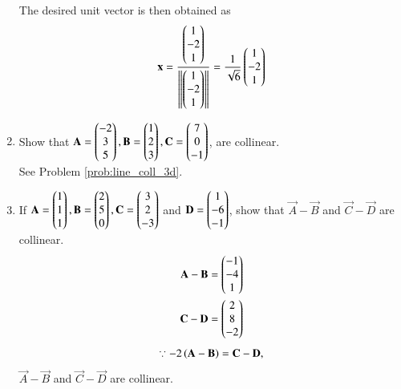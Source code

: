 \begin{enumerate}[label=\arabic*.,ref=\thesubsection.\theenumi]
\begin{align}
\end{align}
%
The desired unit vector is then obtained as
%
\begin{align}
\mathbf{x} =\frac{\begin{pmatrix}1\\-2\\1\end{pmatrix}}{\left\lVert\begin{pmatrix}1\\-2\\1\end{pmatrix}\right\rVert}
=\frac{1}{\sqrt{6}}\begin{pmatrix}1\\-2\\1\end{pmatrix}
\end{align}
\item Show that 
$\mathbf{A}=\begin{pmatrix}-2\\3\\5\end{pmatrix}, \mathbf{B}=\begin{pmatrix}1\\2\\3\end{pmatrix}, \mathbf{C}=\begin{pmatrix}7\\0\\-1\end{pmatrix}$, are collinear.
%
\\
\solution See Problem \ref{prob:line_coll_3d}.
\item If 
$\mathbf{A}=\begin{pmatrix}1\\1\\1\end{pmatrix}, \mathbf{B}=\begin{pmatrix}2\\5\\0\end{pmatrix}, \mathbf{C}=\begin{pmatrix}3\\2\\-3\end{pmatrix}$  and $ \mathbf{D}=\begin{pmatrix}1\\-6\\-1\end{pmatrix}$,
show that  $\vec{A}-\vec{B}$ and $\vec{C}-\vec{D}$ are collinear.
%
\\
\solution 
%
\begin{align}
\mathbf{A}-\mathbf{B} &= \begin{pmatrix}-1\\-4\\1\end{pmatrix}
\\
\mathbf{C}-\mathbf{D} &= \begin{pmatrix}2\\8\\-2\end{pmatrix}
\end{align}
%
%
\begin{align}
\because -2\left(\mathbf{A}-\mathbf{B}\right) =  \mathbf{C}-\mathbf{D},
\end{align}
%
$\vec{A}-\vec{B}$ and $\vec{C}-\vec{D}$ are collinear.


\end{enumerate}
